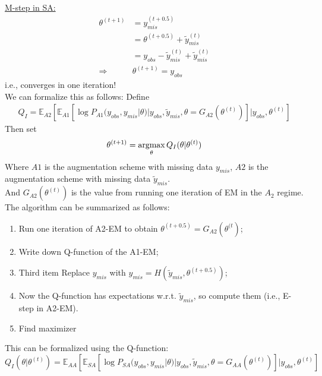 \documentclass[12pt]{article}
\newcommand{\argmax}{\operatornamewithlimits{argmax}}
\begin{document}
\begin{flushleft}
\bigskip
\underline{M-step in SA:}
\begin{align*}
\theta^{(t+1)} & = y_{mis}^{(t+0.5)}\\
               & = \theta^{(t+0.5)} + \tilde{y}_{mis}^{(t)}\\
               & = y_{obs}-\tilde{y}_{mis}^{(t)}+\tilde{y}_{mis}^{(t)}\\
\Longrightarrow & \theta^{(t+1)} = y_{obs}
\end{align*}
i.e., converges in one iteration! \smiley{}\\
We can formalize this as follows:
Define
\begin{align*}
Q_I=\mathbb{E}_{A2}[\mathbb{E}_{A1}[\log P_{A1}(y_{obs},y_{mis}|\theta)| y_{obs}, \tilde{y}_{mis}, \theta=G_{A2}(\theta^{(t)})]| y_{obs}, \theta^{(t)}]
\end{align*}
Then set
\begin{align*}
\theta^{(t+1)}= \argmax_{\theta} Q_I(\theta|\theta^{(t)})
\end{align*}
Where $A1$ is the augmentation scheme with missing data $y_{mis}$, $A2$ is the augmentation scheme with missing data $\tilde{y}_{mis}$.\\
And $G_{A2}(\theta^{(t)})$ is the value from running one iteration of EM in the $A_2$ regime.\\

\bigskip
The algorithm can be summarized as follows:\\
\begin{enumerate}
  \item Run one iteration of A2-EM to obtain $\theta^{(t+0.5)}=G_{A2}( \theta^{(t})$;
  \item Write down Q-function of the A1-EM;
  \item Third item Replace $y_{mis}$ with $y_{mis}=H(\tilde{y}_{mis},\theta^{(t+0.5)})$;
  \item Now the Q-function has expectations w.r.t. $\tilde{y}_{mis}$, so compute them (i.e., E-step in A2-EM).
  \item Find maximizer 
  \end{enumerate}
  This can be formalized using the Q-function:
  \begin{equation*}
  Q_I(\theta|\theta^{(t)})=\mathbb{E}_{AA}[\mathbb{E}_{SA}[\log P_{SA}(y_{obs},y_{mis}|\theta)| y_{obs}, \tilde{y}_{mis}, \theta=G_{AA}(\theta^{(t)})]| y_{obs}, \theta^{(t)}]
  \end{equation*}


\end{flushleft}
\end{document}
